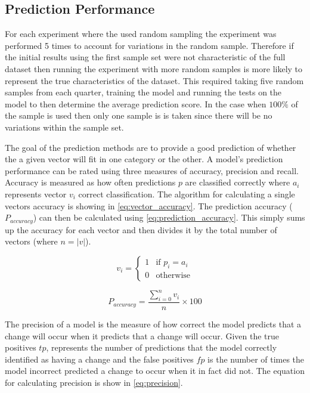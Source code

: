 \subsection{Prediction Performance}

For each experiment where the used random sampling the experiment was performed 5 times to account for variations in the random sample. Therefore if the initial results using the first sample set were not characteristic of the full dataset then running the experiment with more random samples is more likely to represent the true characteristics of the dataset. This required taking five random samples from each quarter, training the model and running the tests on the model to then determine the average prediction score. In the case when $100\%$ of the sample is used then only one sample is is taken since there will be no variations within the sample set.

The goal of the prediction methods are to provide a good prediction of whether the a given vector will fit in one category or the other. A model's prediction performance can be rated using three measures of accuracy, precision and recall. Accuracy is measured as how often predictions $p$ are classified correctly where $a_i$ represents vector $v_i$ correct classification. The algorithm for calculating a single vectors accuracy is showing in \autoref{eq:vector_accuracy}. The prediction accuracy ($P_{accuracy}$) can then be calculated using \autoref{eq:prediction_accuracy}. This simply sums up the accuracy for each vector and then divides it by the total number of vectors (where $n = |v|$).

\begin{equation} 
\label{eq:vector_accuracy}
v_i = \left\{\begin{matrix}
1 & \text{if } p_i = a_i\\ 
0 & \text{otherwise}
\end{matrix}\right.
\end{equation}

\begin{equation}
\label{eq:prediction_accuracy}
P_{accuracy} = \frac{\sum_{i=0}^{n}v_i}{n} \times 100
\end{equation}

The precision of a model is the measure of how correct the model predicts that a change will occur when it predicts that a change will occur. Given the true positives $tp$, represents the number of predictions that the model correctly identified as having a change and the false positives $fp$ is the number of times the model incorrect predicted a change to occur when it in fact did not. The equation for calculating precision is show in \autoref{eq:precision}.

